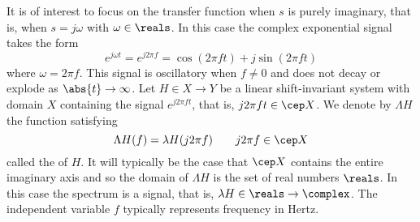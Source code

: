 It is of interest to focus on the transfer function when $s$ is purely imaginary, that is, when $s = j \omega$ with $\omega \in \reals$.  In this case the complex exponential signal takes the form
\[
e^{j\omega t} = e^{j 2\pi f} = \cos( 2\pi f t) + j \sin( 2\pi f t)
\] 
where $\omega = 2\pi f$.  This signal is oscillatory when $f \neq 0$ and does not decay or explode as $\abs{t} \rightarrow \infty$.  Let $H \in X \to Y$ be a linear shift-invariant system with domain $X$ containing the signal $e^{j 2\pi f t}$, that is, $j 2\pi f t \in \cep X$.  We denote by $\Lambda H$ the function satisfying
\[
\Lambda H(f) = \lambda H( j 2\pi f ) \qquad j 2\pi f \in \cep X
\]
called the  of $H$.  It will typically be the case that $\cep X$ contains the entire imaginary axis and so the domain of $\Lambda H$ is the set of real numbers $\reals$.  In this case  the spectrum is a signal, that is, $\lambda H \in \reals \to \complex$.  The independent variable $f$ typically represents frequency in Hertz. 

